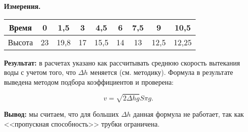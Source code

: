 \begin{center}
  \textbf{Измерения.}
\end{center}

\begin{table}[h]
  \centering
  \begin{tabular}{|c|c|c|c|c|c|c|c|c|}
    \hline
    Время & 0 & 1,5 & 3 & 4,5 & 6 & 7,5 & 9 & 10,5\\
    \hline
    Высота & 23 & 19,8 & 17 & 15,5& 14 & 13 & 12,5 & 12,25\\
    \hline
  \end{tabular}
\end{table}

\textbf{Результат:} в расчетах указано как рассчитывать среднюю
скорость вытекания воды с учетом того, что $\Delta h$ меняется
(см. методику). Формула в результате выведена методом подбора
коэффициентов и проверена:

\begin{equation}
  \label{eq:bz09_2_5}
  v = \sqrt{2 \Delta h g}  S \pi g.
\end{equation}

\textbf{Вывод:} мы считаем, что для больших $\Delta h$ данная формула не
работает, так как <<пропускная способность>> трубки ограничена.

